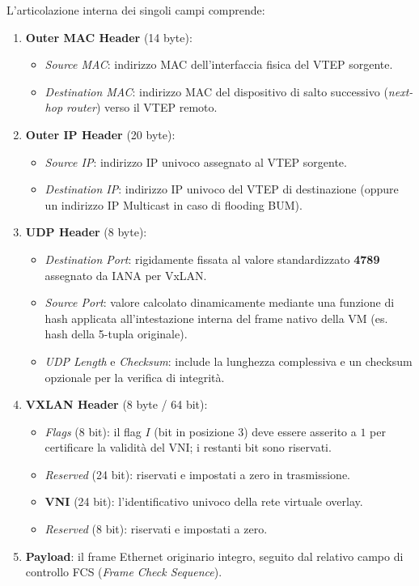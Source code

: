 \documentclass[11pt, a4paper]{article}
\begin{document}
L'articolazione interna dei singoli campi comprende:
\begin{enumerate}
    \item \textbf{Outer MAC Header} (14 byte):
    \begin{itemize}[noitemsep]
        \item \emph{Source MAC}: indirizzo MAC dell'interfaccia fisica del VTEP sorgente.
        \item \emph{Destination MAC}: indirizzo MAC del dispositivo di salto successivo (\emph{next-hop router}) verso il VTEP remoto.
    \end{itemize}
    \item \textbf{Outer IP Header} (20 byte):
    \begin{itemize}[noitemsep]
        \item \emph{Source IP}: indirizzo IP univoco assegnato al VTEP sorgente.
        \item \emph{Destination IP}: indirizzo IP univoco del VTEP di destinazione (oppure un indirizzo IP Multicast in caso di flooding BUM).
    \end{itemize}
    \item \textbf{UDP Header} (8 byte):
    \begin{itemize}[noitemsep]
        \item \emph{Destination Port}: rigidamente fissata al valore standardizzato \textbf{4789} assegnato da IANA per VxLAN.
        \item \emph{Source Port}: valore calcolato dinamicamente mediante una funzione di hash applicata all'intestazione interna del frame nativo della VM (es. hash della 5-tupla originale).
        \item \emph{UDP Length} e \emph{Checksum}: include la lunghezza complessiva e un checksum opzionale per la verifica di integrità.
    \end{itemize}
    \item \textbf{VXLAN Header} (8 byte / 64 bit):
    \begin{itemize}[noitemsep]
        \item \emph{Flags} (8 bit): il flag $I$ (bit in posizione 3) deve essere asserito a $1$ per certificare la validità del VNI; i restanti bit sono riservati.
        \item \emph{Reserved} (24 bit): riservati e impostati a zero in trasmissione.
        \item \textbf{VNI} (24 bit): l'identificativo univoco della rete virtuale overlay.
        \item \emph{Reserved} (8 bit): riservati e impostati a zero.
    \end{itemize}
    \item \textbf{Payload}: il frame Ethernet originario integro, seguito dal relativo campo di controllo FCS (\emph{Frame Check Sequence}).
\end{enumerate}
\end{document}
